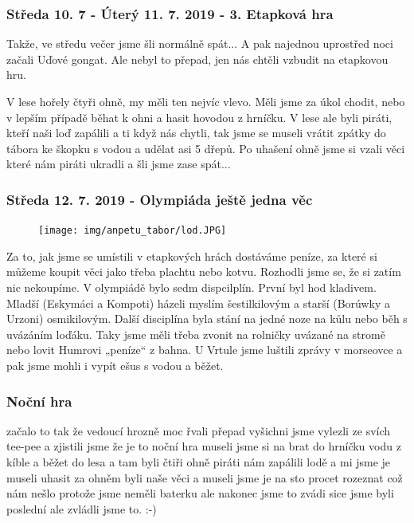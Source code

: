 \subsubsection{Středa 10. 7 - Úterý 11. 7. 2019 - 3. Etapková hra} %
\label{ssub:3_etapková_hra}

Takže, ve středu večer jsme šli normálně spát... A pak najednou uprostřed noci začali Uďové gongat. Ale nebyl to přepad, jen nás chtěli vzbudit na etapkovou hru.

V lese hořely čtyři ohně, my měli ten nejvíc vlevo. Měli jsme za úkol chodit, nebo v lepším případě běhat k ohni a hasit hovodou z hrníčku. V lese ale byli piráti, kteří naši loď zapálili a ti když nás chytli, tak jsme se museli vrátit zpátky do tábora ke škopku s vodou a udělat asi 5 dřepů. Po uhašení ohně jsme si vzali věci které nám piráti ukradli a šli jsme zase spát...


\subsubsection{Středa 12. 7. 2019 - Olympiáda
ještě jedna věc} %
\label{ssub:středa_12_7_2019_olympiáda_ještě_jedna_věc}
\begin{figure}
	\centering
	\vspace*{-45pt}
	\texttt{[image: img/anpetu\_tabor/lod.JPG]}
\end{figure}
Za to, jak jsme se umístili v etapkových hrách dostáváme peníze, za které si můžeme koupit věci jako třeba plachtu nebo kotvu. Rozhodli jsme se, že si zatím nic nekoupíme.
V olympiádě bylo sedm dispcilplín. První byl hod kladivem. Mladší (Eskymáci a Kompoti) házeli myslím šestilkilovým a starší (Borúwky a Urzoni) osmikilovým. Další disciplína byla stání na jedné noze na kůlu nebo běh s uvázáním loďáku.
Taky jsme měli třeba zvonit na rolničky uvázané na stromě nebo lovit Humrovi „peníze“ z bahna.
U Vrtule jsme luštili zprávy v morseovce a pak jsme mohli i vypít ešus s vodou a běžet.


\subsubsection{Noční hra} %
\label{sub:noční_hra}

začalo to tak že vedoucí hrozně moc řvali přepad vyšichni jsme vylezli ze svích tee-pee a zjistili jsme že je to noční hra museli jsme si na brat do hrníčku vodu z kíble a běžet do lesa a tam byli čtiři ohně piráti nám zapálili lodě a mi jsme je museli uhasit za ohněm byli naše věci a museli jsme je na sto procet rozeznat což nám nešlo protože jsme neměli baterku ale nakonec jsme to zvádi sice jsme byli poslední ale zvládli jsme to. :-)


